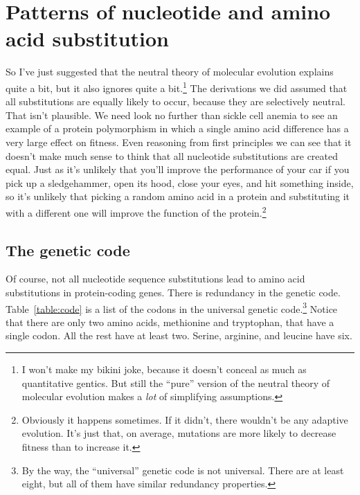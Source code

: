 \chapter{Patterns of nucleotide and amino acid substitution}

So I've just suggested that the neutral theory of molecular evolution
explains quite a bit, but it also ignores quite a bit.\footnote{I
  won't make my bikini joke, because it doesn't conceal as much as
  quantitative gentics. But still the ``pure'' version of the neutral
  theory of molecular evolution makes a {\it lot\/} of simplifying
  assumptions.} The derivations we did assumed that all substitutions
are equally likely to occur, because they are selectively
neutral. That isn't plausible. We need look no further than sickle
cell anemia to see an example of a protein polymorphism in which a
single amino acid difference has a very large effect on fitness. Even
reasoning from first principles we can see that it doesn't make much
sense to think that all nucleotide substitutions are created
equal. Just as it's unlikely that you'll improve the performance of
your car if you pick up a sledgehammer, open its hood, close your
eyes, and hit something inside, so it's unlikely that picking a random
amino acid in a protein and substituting it with a different one will
improve the function of the protein.\footnote{Obviously it happens
  sometimes. If it didn't, there wouldn't be any adaptive
  evolution. It's just that, on average, mutations are more likely to
  decrease fitness than to increase it. }

\section*{The genetic code}

Of course, not all nucleotide sequence substitutions lead to amino
acid substitutions in protein-coding genes. There is redundancy in the
genetic code. Table~\ref{table:code} is a list of the codons in the
universal genetic code.\footnote{By the way, the ``universal'' genetic
  code is not universal. There are at least eight, but all of them
  have similar redundancy properties.} Notice that there are only two
amino acids, methionine and tryptophan, that have a single codon. All the
rest have at least two. Serine, arginine, and leucine have
six.


